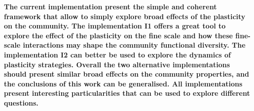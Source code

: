\textbf{The current implementation present the simple and coherent framework that allow to simply explore broad effects of the plasticity on the community. The implementation I1 offers a great tool to explore the effect of the plasticity on the fine scale and how these fine-scale interactions may shape the community functional diversity. The implementation I2 can better be used to explore the dynamics of plasticity strategies. Overall the two alternative implementations should present similar broad effects on the community properties, and the conclusions of this work can be generalised. All implementations present interesting particularities that can be used to explore different questions. }




